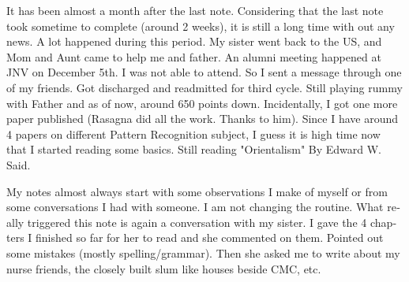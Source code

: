 \vskip 2pt
\begin{english}
\date{Monday December 13 2010}

It has been almost a month after the last note. Considering that the last note took sometime to complete (around 2 weeks), it is still a long time with out any news. A lot happened during this period. My sister went back to the US, and Mom and Aunt came to help me and father. An alumni meeting happened at JNV on December 5th. I was not able to attend. So I sent a message through one of my friends. Got discharged and readmitted for third cycle. Still playing rummy with Father and as of now, around 650 points down. Incidentally, I got one more paper published (Rasagna did all the work. Thanks to him). Since I have around 4 papers on different Pattern Recognition subject, I guess it is high time now that I started reading some basics. Still reading "Orientalism" By Edward W. Said. 

My notes almost always start with some observations I make of myself or from some conversations I had with someone. I am not changing the routine. What really triggered this note is again a conversation with my sister. I gave the 4 chapters I finished so far for her to read and she commented on them. Pointed out some mistakes (mostly spelling/grammar). Then she asked me to write about my nurse friends, the closely built slum like houses beside CMC, etc.
\end{english}
\newpage
